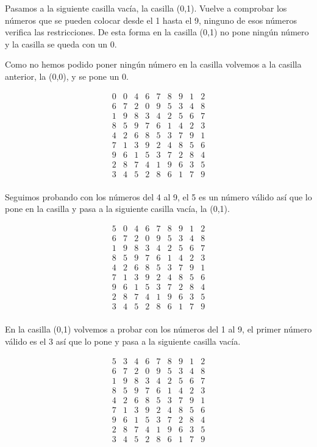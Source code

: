 \documentclass[11pt, a4paper]{article}
\theoremstyle{theorem-style}
\theoremstyle{definition-style}
\theoremstyle{remark-style}
\theoremstyle{example-style}
\begin{document}
Pasamos a la siguiente casilla vacía, la casilla (0,1). Vuelve a comprobar los números que se pueden colocar desde el 1 hasta el 9, ninguno de esos números verifica las restricciones. De esta forma en la casilla (0,1) no pone ningún número y la casilla se queda con un 0.

Como no hemos podido poner ningún número en la casilla volvemos a la casilla anterior, la (0,0), y se pone un 0.

\[
\begin{array}{ccccccccc}
0 & 0 & 4 & 6 & 7 & 8 & 9 & 1 & 2\\
6 & 7 & 2 & 0 & 9 & 5 & 3 & 4 & 8\\
1 & 9 & 8 & 3 & 4 & 2 & 5 & 6 & 7\\
8 & 5 & 9 & 7 & 6 & 1 & 4 & 2 & 3\\
4 & 2 & 6 & 8 & 5 & 3 & 7 & 9 & 1\\
7 & 1 & 3 & 9 & 2 & 4 & 8 & 5 & 6\\
9 & 6 & 1 & 5 & 3 & 7 & 2 & 8 & 4\\
2 & 8 & 7 & 4 & 1 & 9 & 6 & 3 & 5\\
3 & 4 & 5 & 2 & 8 & 6 & 1 & 7 & 9\\
\end{array}
\]

Seguimos probando con los números del 4 al 9, el 5 es un número válido así que lo pone en la casilla y pasa a la siguiente casilla vacía, la (0,1).

\[
\begin{array}{ccccccccc}
5 & 0 & 4 & 6 & 7 & 8 & 9 & 1 & 2\\
6 & 7 & 2 & 0 & 9 & 5 & 3 & 4 & 8\\
1 & 9 & 8 & 3 & 4 & 2 & 5 & 6 & 7\\
8 & 5 & 9 & 7 & 6 & 1 & 4 & 2 & 3\\
4 & 2 & 6 & 8 & 5 & 3 & 7 & 9 & 1\\
7 & 1 & 3 & 9 & 2 & 4 & 8 & 5 & 6\\
9 & 6 & 1 & 5 & 3 & 7 & 2 & 8 & 4\\
2 & 8 & 7 & 4 & 1 & 9 & 6 & 3 & 5\\
3 & 4 & 5 & 2 & 8 & 6 & 1 & 7 & 9\\
\end{array}
\]
 
En la casilla (0,1) volvemos a probar con los números del 1 al 9, el primer número válido es el 3 así que lo pone y pasa a la siguiente casilla vacía.

\[
\begin{array}{ccccccccc}
5 & 3 & 4 & 6 & 7 & 8 & 9 & 1 & 2\\
6 & 7 & 2 & 0 & 9 & 5 & 3 & 4 & 8\\
1 & 9 & 8 & 3 & 4 & 2 & 5 & 6 & 7\\
8 & 5 & 9 & 7 & 6 & 1 & 4 & 2 & 3\\
4 & 2 & 6 & 8 & 5 & 3 & 7 & 9 & 1\\
7 & 1 & 3 & 9 & 2 & 4 & 8 & 5 & 6\\
9 & 6 & 1 & 5 & 3 & 7 & 2 & 8 & 4\\
2 & 8 & 7 & 4 & 1 & 9 & 6 & 3 & 5\\
3 & 4 & 5 & 2 & 8 & 6 & 1 & 7 & 9\\
\end{array}
\]
\end{document}
